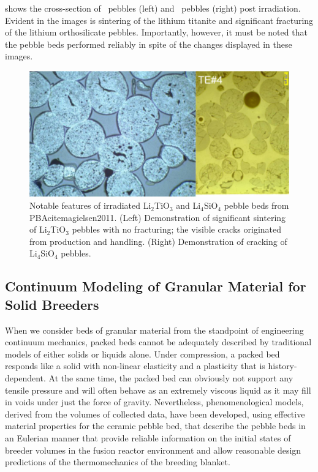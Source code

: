  shows the cross-section of \lit~pebbles (left) and \lis~pebbles (right) post irradiation. Evident in the images is sintering of the lithium titanite and significant fracturing of the lithium orthosilicate pebbles. Importantly, however, it must be noted that the pebble beds performed reliably in spite of the changes displayed in these images.\cite{Magielsen2007} 


\begin{figure}[t!]
\centering
\includegraphics[width=\singleimagewidth]{figures/Fig-10}
\caption{Notable features of irradiated Li$_2$TiO$_3$ and Li$_4$SiO$_4$ pebble beds from PBAcite{magielsen2011}. (Left) Demonstration of significant sintering of Li$_2$TiO$_3$ pebbles with no fracturing; the visible cracks originated from production and handling. (Right) Demonstration of cracking of Li$_4$SiO$_4$ pebbles.}
\label{fig:pba}
\end{figure}



\subsection{Continuum Modeling of Granular Material for Solid Breeders}
When we consider beds of granular material from the standpoint of engineering continuum mechanics, packed beds cannot be adequately described by traditional models of either solids or liquids alone. Under compression, a packed bed responds like a solid with non-linear elasticity and a plasticity that is history-dependent. At the same time, the packed bed can obviously not support any tensile pressure and will often behave as an extremely viscous liquid as it may fill in voids under just the force of gravity. Nevertheless, phenomenological models, derived from the volumes of collected data, have been developed, using effective material properties for the ceramic pebble bed, that describe the pebble beds in an Eulerian manner that provide reliable information on the initial states of breeder volumes in the fusion reactor environment and allow reasonable design predictions of the thermomechanics of the breeding blanket. 

